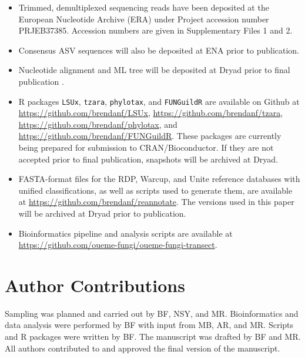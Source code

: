 \documentclass[
  12pt,
]{article}
\providecommand{\tightlist}{%
  \setlength{\itemsep}{0pt}\setlength{\parskip}{0pt}}
\begin{document}
\begin{itemize}
\tightlist
\item
  Trimmed, demultiplexed sequencing reads have been deposited at the European Nucleotide Archive (ERA) under Project accession number PRJEB37385. Accession numbers are given in Supplementary Files 1 and 2.
\item
  Consensus ASV sequences will also be deposited at ENA prior to publication.
\item
  Nucleotide alignment and ML tree will be deposited at Dryad prior to final publication \autocite{furneauxdata2020}.
\item
  R packages \texttt{LSUx}, \texttt{tzara}, \texttt{phylotax}, and \texttt{FUNGuildR} are available on Github at \url{https://github.com/brendanf/LSUx}, \url{https://github.com/brendanf/tzara}, \url{https://github.com/brendanf/phylotax}, and \url{https://github.com/brendanf/FUNGuildR}.
  These packages are currently being prepared for submission to CRAN/Bioconductor.
  If they are not accepted prior to final publication, snapshots will be archived at Dryad.
\item
  FASTA-format files for the RDP, Warcup, and Unite reference databases with unified classifications, as well as scripts used to generate them, are available at \url{https://github.com/brendanf/reannotate}. The versions used in this paper will be archived at Dryad prior to publication.
\item
  Bioinformatics pipeline and analysis scripts are available at \url{https://github.com/oueme-fungi/oueme-fungi-transect}.
\end{itemize}

\hypertarget{author-contributions}{%
\section*{Author Contributions}\label{author-contributions}}

Sampling was planned and carried out by BF, NSY, and MR.
Bioinformatics and data analysis were performed by BF with input from MB, AR, and MR.
Scripts and R packages were written by BF.
The manuscript was drafted by BF and MR.
All authors contributed to and approved the final version of the manuscript.

\processdelayedfloats
\end{document}
